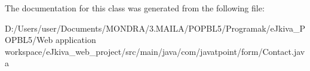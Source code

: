 The documentation for this class was generated from the following file\+:\begin{DoxyCompactItemize}
\item 
D\+:/\+Users/user/\+Documents/\+M\+O\+N\+D\+R\+A/3.\+M\+A\+I\+L\+A/\+P\+O\+P\+B\+L5/\+Programak/e\+Jkiva\+\_\+\+P\+O\+P\+B\+L5/\+Web application workspace/e\+Jkiva\+\_\+web\+\_\+project/src/main/java/com/javatpoint/form/Contact.\+java\end{DoxyCompactItemize}
